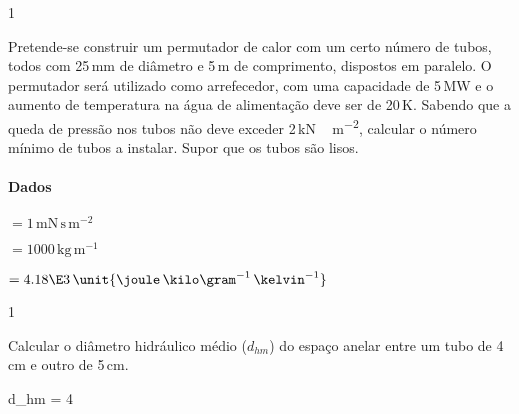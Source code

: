 \documentclass[\mainfilename]{subfiles}
\begin{document}
\begin{questionBox}1{} %
    
    Pretende-se construir um permutador de calor com um certo número de tubos, todos com 25\,\unit{\milli\metre} de diâmetro e 5\,\unit{\metre} de comprimento, dispostos em paralelo. O permutador será utilizado como arrefecedor, com uma capacidade de 5\,\unit{\mega\watt} e o aumento de temperatura na água de alimentação deve ser de 20\,\unit{\kelvin}. Sabendo que a queda de pressão nos tubos não deve exceder 2\,\unit{\kilo\newton\,\metre^{-2}}, calcular o número mínimo de tubos a instalar. Supor que os tubos são lisos. 
    
    \paragraph*{Dados}
    \begin{description}
        \begin{multicols}{2}
            \item[\chemmu] \(=1\,\unit{\milli\newton\,\second\,\metre^{-2}}\) 
            \item[\chemrho] \(=1000\,\unit{\kilo\gram\,\metre^{-1}}\)
        \end{multicols}
        \item[\(C_{p}(\ch{H2O})\)] \(=4.18\E3\,\unit{\joule\,\kilo\gram^{-1}\,\kelvin^{-1}}\)
    \end{description}
    
\end{questionBox}

\begin{questionBox}1{} %
    
    Calcular o diâmetro hidráulico médio (\(d_{hm}\)) do espaço anelar entre um tubo de 4\,\unit{\centi\metre} e outro de 5\,\unit{\centi\metre}.

    \begin{BM}
        d_{hm}
        = 4\,
    \end{BM}
    
\end{questionBox}
\end{document}

